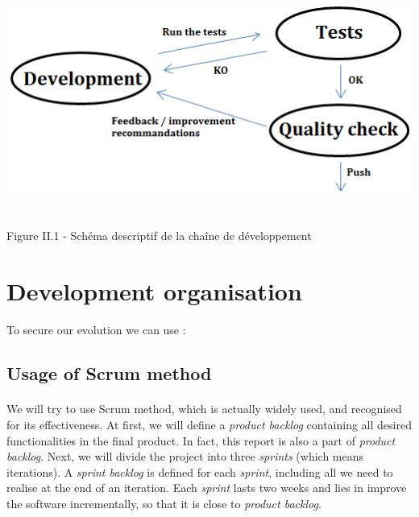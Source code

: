 \documentclass{report}
\begin{document}
\begin{center}
\includegraphics[scale=0.7]{data/cycle_qualite}
~\\~\\Figure II.1 - Sch\'{e}ma descriptif de la cha\^{i}ne de d\'{e}veloppement
\end{center}

\section{Development organisation}

\paragraph{}
\hspace{4mm}\textnormal{To secure our evolution we can use :}

\subsection{Usage of Scrum method}

\paragraph{}
\hspace{4mm}\textnormal{We will try to use Scrum method, which is actually widely used, and 
recognised for its effectiveness. At first, we will define a 
\textit{product backlog} containing all desired functionalities in 
the final product. In fact, this report is also a part of \textit{product backlog}. 
Next, we will divide the project into three \textit{sprints} (which means 
iterations). A \textit{sprint backlog} is defined for each \textit{sprint}, 
including all we need to realise at the end of an iteration. Each 
\textit{sprint} lasts two weeks and lies in improve the software 
incrementally, so that it is close to \textit{product backlog}.}
\end{document}
